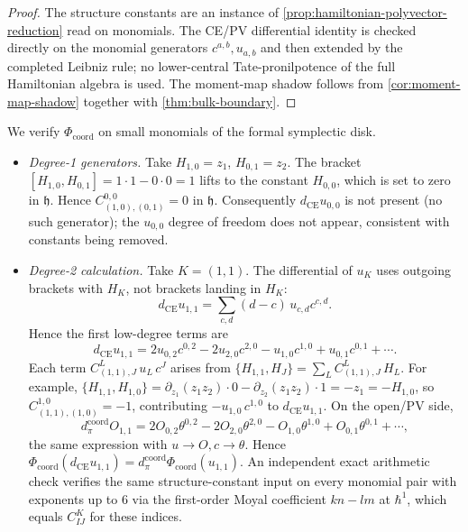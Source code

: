 \documentclass[11pt]{memoir}
\begin{document}
\begin{proof}
  The structure constants are an instance of
  \ref{prop:hamiltonian-polyvector-reduction} read on monomials.
  The CE/PV differential identity is checked directly on the monomial
  generators $c^{a,b},u_{a,b}$ and then extended by the completed
  Leibniz rule; no lower-central Tate-pronilpotence of the full Hamiltonian
  algebra is used. The moment-map shadow follows from
  \ref{cor:moment-map-shadow} together with \ref{thm:bulk-boundary}.
\end{proof}

\begin{ex}\label{ex:low-degree-phi}
  We verify \(\Phi_{\mathrm{coord}}\) on small monomials of the formal
  symplectic disk.

  \begin{itemize}
    \item \emph{Degree-1 generators.} Take $H_{1,0}=z_1$,
      $H_{0,1}=z_2$. The bracket
      $[H_{1,0},H_{0,1}]=1\cdot 1-0\cdot 0=1$ lifts to the constant
      $H_{0,0}$, which is set to zero in $\mathfrak h$. Hence
      $C^{0,0}_{(1,0),(0,1)}=0$ in $\mathfrak h$. Consequently
      $d_{\mathrm{CE}}u_{0,0}$ is not present (no such generator); the
      $u_{0,0}$ degree of freedom does not appear, consistent with
      constants being removed.

    \item \emph{Degree-2 calculation.} Take \(K=(1,1)\).  The
      differential of \(u_K\) uses outgoing brackets with \(H_K\), not
      brackets landing in \(H_K\):
      \[
        d_{\mathrm{CE}}u_{1,1}
        =\sum_{c,d}(d-c)\,u_{c,d}c^{c,d}.
      \]
      Hence the first low-degree terms are
      \[
        d_{\mathrm{CE}}u_{1,1}
        =
        2u_{0,2}c^{0,2}-2u_{2,0}c^{2,0}
        -u_{1,0}c^{1,0}+u_{0,1}c^{0,1}+\cdots .
      \]
      Each term
      \(C^L_{(1,1),J}\,u_L\,c^J\) arises from
      $\{H_{1,1},H_J\}=\sum_L C^L_{(1,1),J}\,H_L$. For example,
      $\{H_{1,1},H_{1,0}\}=\partial_{z_1}(z_1z_2)\cdot 0-
      \partial_{z_2}(z_1z_2)\cdot 1=-z_1=-H_{1,0}$, so
      $C^{1,0}_{(1,1),(1,0)}=-1$, contributing $-u_{1,0}\,c^{1,0}$ to
      $d_{\mathrm{CE}}u_{1,1}$. On the open/PV side,
      \[
        d_\pi^{\mathrm{coord}} O_{1,1}
        =
        2O_{0,2}\theta^{0,2}-2O_{2,0}\theta^{2,0}
        -O_{1,0}\theta^{1,0}+O_{0,1}\theta^{0,1}+\cdots ,
      \]
      the same expression with $u\to O,c\to\theta$. Hence
	      \(\Phi_{\mathrm{coord}}(d_{\mathrm{CE}}u_{1,1})
	      =d_\pi^{\mathrm{coord}}\Phi_{\mathrm{coord}}(u_{1,1})\). An independent
      exact arithmetic check verifies the same structure-constant input
      on every monomial pair with exponents up to \(6\) via the
      first-order Moyal coefficient \(kn-lm\) at \(\hbar^1\), which equals
      \(C^K_{IJ}\) for these indices.


\end{itemize}
\end{ex}
\end{document}
